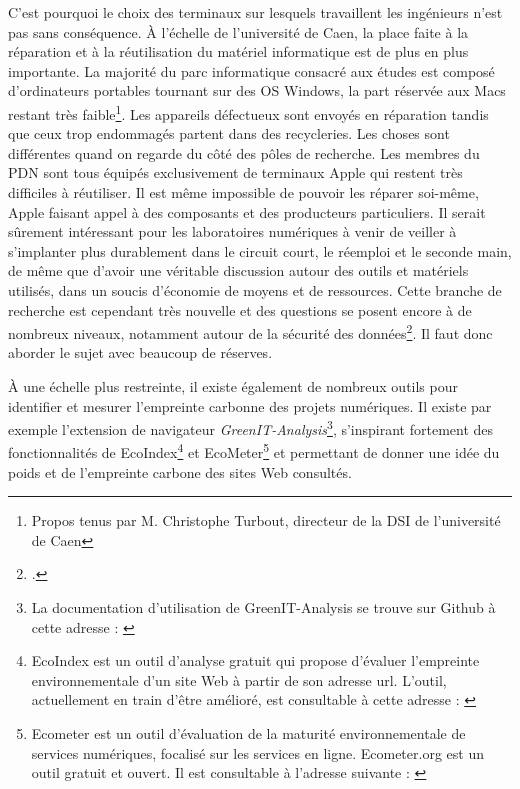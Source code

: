 \documentclass[a4paper,12pt,twoside]{book}
\begin{document}
C'est pourquoi le choix des terminaux sur lesquels travaillent les ingénieurs n'est pas sans conséquence. À l'échelle de l'université de Caen, la place faite à la réparation et à la réutilisation du matériel informatique est de plus en plus importante. La majorité du parc informatique consacré aux études est composé d'ordinateurs portables tournant sur des OS Windows, la part réservée aux Macs restant très faible\footnote{Propos tenus par M. Christophe Turbout, directeur de la DSI de l'université de Caen}. Les appareils défectueux sont envoyés en réparation tandis que ceux trop endommagés partent dans des recycleries. Les choses sont différentes quand on regarde du côté des pôles de recherche. Les membres du \acrshort{PDN} sont tous équipés exclusivement de terminaux Apple qui restent très difficiles à réutiliser. Il est même impossible de pouvoir les réparer soi-même, Apple faisant appel à des composants et des producteurs particuliers. Il serait sûrement intéressant pour les laboratoires numériques à venir de veiller à s'implanter plus durablement dans le circuit court, le réemploi et le seconde main, de même que d'avoir une véritable discussion autour des outils et matériels utilisés, dans un soucis d'économie de moyens et de ressources. Cette branche de recherche est cependant très nouvelle et des questions se posent encore à de nombreux niveaux, notamment autour de la sécurité des données\footcite{clubic_seconde_2021}. Il faut donc aborder le sujet avec beaucoup de réserves.


À une échelle plus restreinte, il existe également de nombreux outils pour identifier et mesurer l'empreinte carbonne des projets numériques. Il existe par exemple l'extension de navigateur \textit{GreenIT-Analysis}\footnote{La documentation d'utilisation de GreenIT-Analysis se trouve sur Github à cette adresse : \cite{analysis}}, s'inspirant fortement des fonctionnalités de EcoIndex\footnote{EcoIndex est un outil d'analyse gratuit qui propose d'évaluer l'empreinte environnementale d'un site Web à partir de son adresse url. L'outil, actuellement en train d'être amélioré, est consultable à cette adresse : \cite{ecoindex}} et EcoMeter\footnote{Ecometer est un outil d'évaluation de la maturité environnementale de services numériques,
focalisé sur les services en ligne. Ecometer.org est un outil gratuit et ouvert. Il est consultable à l'adresse suivante : \cite{ecometer}} et permettant de donner une idée du poids et de l'empreinte carbone des sites Web consultés. 
\end{document}
